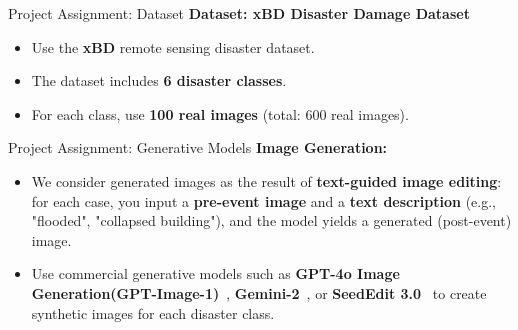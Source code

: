 \begin{refsection}
  \begin{frame}{Project Assignment: Dataset}
    \textbf{Dataset: xBD Disaster Damage Dataset}
    \begin{itemize}
      \item Use the \textbf{xBD} remote sensing disaster dataset.
      \item The dataset includes \textbf{6 disaster classes}.
      \item For each class, use \textbf{100 real images} (total: 600 real images).
    \end{itemize}
    \bottomleftrefs
  \end{frame}
  \end{refsection}
  
  \begin{refsection}
    \begin{frame}{Project Assignment: Generative Models}
      \textbf{Image Generation:}
      \begin{itemize}
        \item We consider generated images as the result of \textbf{text-guided image editing}: for each case, you input a \textbf{pre-event image} and a \textbf{text description} (e.g., "flooded", "collapsed building"), and the model yields a generated (post-event) image.
        \item Use commercial generative models such as \textbf{GPT-4o Image Generation(GPT-Image-1)}~\parencite{gptimage1}, \textbf{Gemini-2}~\parencite{gemini2}, or \textbf{SeedEdit 3.0}~\parencite{wang2025seedit} to create synthetic images for each disaster class.
      \end{itemize}
      \bottomleftrefs
    \end{frame}
  \end{refsection}
  
